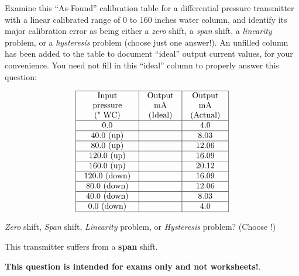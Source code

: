 

Examine this ``As-Found'' calibration table for a differential pressure transmitter with a linear calibrated range of 0 to 160 inches water column, and identify its major calibration error as being either a {\it zero} shift, a {\it span} shift, a {\it linearity} problem, or a {\it hysteresis} problem (choose just one answer!).  An unfilled column has been added to the table to document ``ideal'' output current values, for your convenience.  You need not fill in this ``ideal'' column to properly answer this question:


$$\vbox{\offinterlineskip
\halign{\strut
\vrule \quad\hfil # \ \hfil & 
\vrule \quad\hfil # \ \hfil & 
\vrule \quad\hfil # \ \hfil \vrule \cr
\noalign{\hrule}
%
Input & Output & Output \cr
%
pressure & mA & mA \cr
%
(" WC) & (Ideal) & (Actual) \cr
%
\noalign{\hrule}
%
0.0 & & 4.0 \cr
%
\noalign{\hrule}
%
40.0 (up) & & 8.03 \cr
%
\noalign{\hrule}
%
80.0 (up) & & 12.06 \cr
%
\noalign{\hrule}
%
120.0 (up) & & 16.09 \cr
%
\noalign{\hrule}
%
160.0 (up) & & 20.12 \cr
%
\noalign{\hrule}
%
120.0 (down) & & 16.09 \cr
%
\noalign{\hrule}
%
80.0 (down) & & 12.06 \cr
%
\noalign{\hrule}
%
40.0 (down) & & 8.03 \cr
%
\noalign{\hrule}
%
0.0 (down) & & 4.0 \cr
%
\noalign{\hrule}
} %
}$$ %

{\it Zero} shift, {\it Span} shift, {\it Linearity} problem, or {\it Hysteresis} problem?  (Choose !)







This transmitter suffers from a {\bf span} shift.







{\bf This question is intended for exams only and not worksheets!}.


